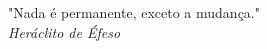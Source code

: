\pretextualchapter{}
\vfill
\begin{flushright}
	"Nada é permanente, exceto a mudança."\\
	\textit{Heráclito de Éfeso}
\end{flushright}








